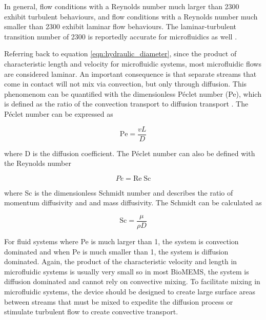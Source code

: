 \par In general, flow conditions with a Reynolds number much larger than 2300 exhibit turbulent behaviours, and flow conditions with a Reynolds number much smaller than 2300 exhibit laminar flow behaviours. The laminar-turbulent transition number of 2300 is reportedly accurate for microfluidics as well \cite{PAMB-14}.

\par Referring back to equation \ref{eqn:hydraulic_diameter}, since the product of characteristic length and velocity for microfluidic systems, most microfluidic flows are considered laminar. An important consequence is that separate streams that come in contact will not mix via convection, but only through diffusion. This phenomenom can be quantified with the dimensionless P\'eclet number (Pe), which is defined as the ratio of the convection transport to diffusion transport \cite{micromixers}. The P\'eclet number can be expressed as 

\begin{equation}
    \text{Pe} = \frac{vL}{D}
\end{equation}

\noindent where D is the diffusion coefficient. The P\'eclet number can also be defined with the Reynolds number

\begin{equation}
    Pe = \text{Re}\;\text{Sc}
\end{equation}

\noindent where Sc is the dimensionless Schmidt number and describes the ratio of momentum diffusivity and and mass diffusivity. The Schmidt can be calculated as

\begin{equation}
    \text{Sc} = \frac{\mu}{\rho D}
\end{equation}

\par For fluid systems where Pe is much larger than 1, the system is convection dominated and when Pe is much smaller than 1, the system is diffusion dominated. Again, the product of the characteristic velocity and length in microfluidic systems is usually very small so in most BioMEMS, the system is diffusion dominated and cannot rely on convective mixing. To facilitate mixing in microfluidic systems, the device should be designed to create large surface areas between streams that must be mixed to expedite the diffusion process or stimulate turbulent flow to create convective transport.

